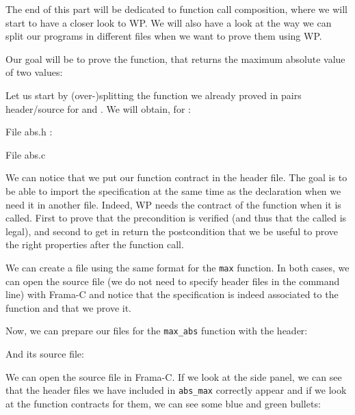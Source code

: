 The end of this part will be dedicated to function call composition,
where we will start to have a closer look to WP. We will also have a
look at the way we can split our programs in different files when we
want to prove them using WP.

Our goal will be to prove the  function, that returns
the maximum absolute value of two values:






Let us start by (over-)splitting the function we already proved in pairs
header/source for  and . We will obtain, for
:



File abs.h :




File abs.c




We can notice that we put our function contract in the header file.
The goal is to be able to import the specification at the same time as
the declaration when we need it in another file. Indeed, WP needs the
contract of the function when it is called. First to prove that the
precondition is verified (and thus that the called is legal), and second
to get in return the postcondition that we be useful to prove the right
properties after the function call.

We can create a file using the same format for the \texttt{max}
function. In both cases, we can open the source file (we do not need to
specify header files in the command line) with Frama-C and notice that
the specification is indeed associated to the function and that we prove
it.


Now, we can prepare our files for the \texttt{max\_abs} function with
the header:






And its source file:






We can open the source file in Frama-C. If we look at the side panel, we
can see that the header files we have included in \texttt{abs\_max}
correctly appear and if we look at the function contracts for them, we
can see some blue and green bullets:



